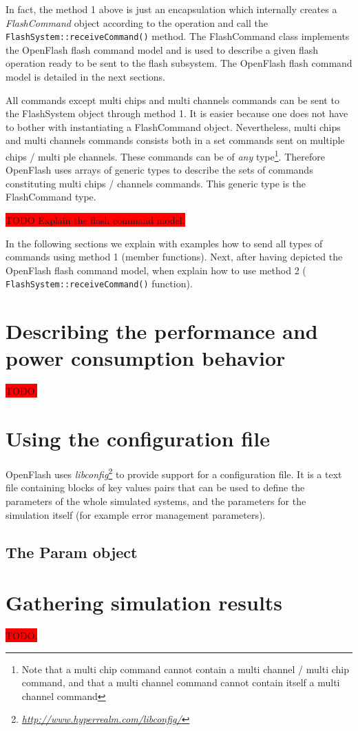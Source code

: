 In fact, the method 1 above is just an encapsulation which internally creates a \emph{FlashCommand} object according to the operation and call the \\\verb+FlashSystem::receiveCommand()+ method. The FlashCommand class implements the OpenFlash flash command model and is used to describe a given flash operation ready to be sent to the flash subsystem. The OpenFlash flash command model is detailed in the next sections.

All commands except multi chips and multi channels commands can be sent to the FlashSystem object through method 1. It is easier because one does not have to bother with instantiating a FlashCommand object. Nevertheless, multi chips and multi channels commands consists both in a set commands sent on multiple chips / multi ple channels. These commands can be of \emph{any} type\footnote{Note that a multi chip command cannot contain a multi channel / multi chip command, and that a multi channel command cannot contain itself a multi channel command}. Therefore OpenFlash uses arrays of generic types to describe the sets of commands constituting multi chips / channels commands. This generic type is the FlashCommand type.

\colorbox{red}{TODO Explain the flash command model.}

In the following sections we explain with examples how to send all types of commands using method 1 (member functions). Next, after having depicted the OpenFlash flash command model, when explain how to use method 2 (\\\verb+FlashSystem::receiveCommand()+ function).



\section{Describing the performance and power consumption behavior}

\colorbox{red}{TODO.}

\section{Using the configuration file}
OpenFlash uses \emph{libconfig}\footnote{\href{http://www.hyperrealm.com/libconfig/}{\textit{http://www.hyperrealm.com/libconfig/}}} to provide support for a configuration file. It is a text file containing blocks of key values pairs that can be used to define the parameters of the whole simulated systems, and the parameters for the simulation itself (for example error management parameters).

\subsection{The Param object}

\section{Gathering simulation results}

\colorbox{red}{TODO.}


